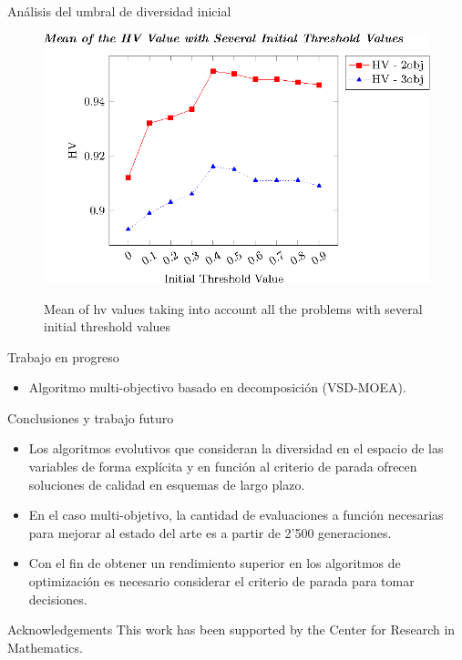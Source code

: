 \documentclass{beamer}
\newcommand{\HV}{{\sc hv}}
\begin{document}
\begin{frame}{Análisis del umbral de diversidad inicial}
\begin{figure}[t]
\centering
\includegraphics[scale=0.85]{Images/Graphic-Initial-Distance_tikz-figure0.eps} \\
\caption{Mean of \HV{} values taking into account all the problems with several initial threshold values}\label{fig:Initial-distance-factor}
\end{figure}
\end{frame}


\begin{frame}{Trabajo en progreso}
\begin{itemize}
    \item Algoritmo multi-objectivo basado en decomposición (VSD-MOEA).
\end{itemize}
\end{frame}


\begin{frame}{Conclusiones y trabajo futuro}
    \begin{itemize}
        \item Los algoritmos evolutivos que consideran la diversidad en el espacio de las variables de forma explícita y en función al criterio de parada ofrecen soluciones de calidad en esquemas de largo plazo. 
        \item En el caso multi-objetivo, la cantidad de evaluaciones a función necesarias para mejorar al estado del arte es a partir de 2'500 generaciones.
        \item Con el fin de obtener un rendimiento superior en los algoritmos de optimización es necesario considerar el criterio de parada para tomar decisiones.
    \end{itemize}
\end{frame}




\begin{frame}{Acknowledgements}
This work has been supported by the Center for Research in Mathematics.
\end{frame}
\end{document}
